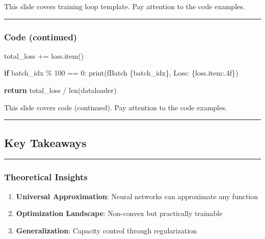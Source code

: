 \documentclass[
  letterpaper,
  DIV=11,
  numbers=noendperiod]{scrartcl}
\newenvironment{Shaded}{\begin{snugshade}}{\end{snugshade}}
\newcommand{\BuiltInTok}[1]{\textcolor[rgb]{0.00,0.23,0.31}{#1}}
\newcommand{\ControlFlowTok}[1]{\textcolor[rgb]{0.00,0.23,0.31}{\textbf{#1}}}
\newcommand{\DecValTok}[1]{\textcolor[rgb]{0.68,0.00,0.00}{#1}}
\newcommand{\NormalTok}[1]{\textcolor[rgb]{0.00,0.23,0.31}{#1}}
\newcommand{\OperatorTok}[1]{\textcolor[rgb]{0.37,0.37,0.37}{#1}}
\newcommand{\SpecialCharTok}[1]{\textcolor[rgb]{0.37,0.37,0.37}{#1}}
\newcommand{\SpecialStringTok}[1]{\textcolor[rgb]{0.13,0.47,0.30}{#1}}
\providecommand{\tightlist}{%
  \setlength{\itemsep}{0pt}\setlength{\parskip}{0pt}}
\begin{document}
This slide covers training loop template. Pay attention to the code
examples.

\begin{center}\rule{0.5\linewidth}{0.5pt}\end{center}

\subsubsection{Code (continued)}\label{code-continued}

\begin{Shaded}
\begin{Highlighting}[]
        
\NormalTok{        total\_loss }\OperatorTok{+=}\NormalTok{ loss.item()}
        
        \ControlFlowTok{if}\NormalTok{ batch\_idx }\OperatorTok{\%} \DecValTok{100} \OperatorTok{==} \DecValTok{0}\NormalTok{:}
            \BuiltInTok{print}\NormalTok{(}\SpecialStringTok{f\textquotesingle{}Batch }\SpecialCharTok{\{}\NormalTok{batch\_idx}\SpecialCharTok{\}}\SpecialStringTok{, Loss: }\SpecialCharTok{\{}\NormalTok{loss}\SpecialCharTok{.}\NormalTok{item}\SpecialCharTok{:.4f\}}\SpecialStringTok{\textquotesingle{}}\NormalTok{)}
    
    \ControlFlowTok{return}\NormalTok{ total\_loss }\OperatorTok{/} \BuiltInTok{len}\NormalTok{(dataloader)}
\end{Highlighting}
\end{Shaded}

This slide covers code (continued). Pay attention to the code examples.

\begin{center}\rule{0.5\linewidth}{0.5pt}\end{center}

\subsection{Key Takeaways}\label{key-takeaways}

\begin{center}\rule{0.5\linewidth}{0.5pt}\end{center}

\subsubsection{Theoretical Insights}\label{theoretical-insights}

\begin{enumerate}
\def\labelenumi{\arabic{enumi}.}
\tightlist
\item
  \textbf{Universal Approximation}: Neural networks can approximate any
  function
\item
  \textbf{Optimization Landscape}: Non-convex but practically trainable
\item
  \textbf{Generalization}: Capacity control through regularization
\end{enumerate}
\end{document}

